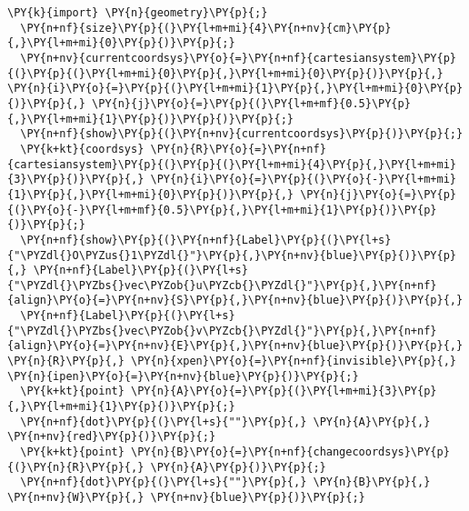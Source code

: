 \begin{Verbatim}[commandchars=\\\{\}]
  \PY{k}{import} \PY{n}{geometry}\PY{p}{;}
  \PY{n+nf}{size}\PY{p}{(}\PY{l+m+mi}{4}\PY{n+nv}{cm}\PY{p}{,}\PY{l+m+mi}{0}\PY{p}{)}\PY{p}{;}
  \PY{n+nv}{currentcoordsys}\PY{o}{=}\PY{n+nf}{cartesiansystem}\PY{p}{(}\PY{p}{(}\PY{l+m+mi}{0}\PY{p}{,}\PY{l+m+mi}{0}\PY{p}{)}\PY{p}{,} \PY{n}{i}\PY{o}{=}\PY{p}{(}\PY{l+m+mi}{1}\PY{p}{,}\PY{l+m+mi}{0}\PY{p}{)}\PY{p}{,} \PY{n}{j}\PY{o}{=}\PY{p}{(}\PY{l+m+mf}{0.5}\PY{p}{,}\PY{l+m+mi}{1}\PY{p}{)}\PY{p}{)}\PY{p}{;}
  \PY{n+nf}{show}\PY{p}{(}\PY{n+nv}{currentcoordsys}\PY{p}{)}\PY{p}{;}
  \PY{k+kt}{coordsys} \PY{n}{R}\PY{o}{=}\PY{n+nf}{cartesiansystem}\PY{p}{(}\PY{p}{(}\PY{l+m+mi}{4}\PY{p}{,}\PY{l+m+mi}{3}\PY{p}{)}\PY{p}{,} \PY{n}{i}\PY{o}{=}\PY{p}{(}\PY{o}{-}\PY{l+m+mi}{1}\PY{p}{,}\PY{l+m+mi}{0}\PY{p}{)}\PY{p}{,} \PY{n}{j}\PY{o}{=}\PY{p}{(}\PY{o}{-}\PY{l+m+mf}{0.5}\PY{p}{,}\PY{l+m+mi}{1}\PY{p}{)}\PY{p}{)}\PY{p}{;}
  \PY{n+nf}{show}\PY{p}{(}\PY{n+nf}{Label}\PY{p}{(}\PY{l+s}{"\PYZdl{}O\PYZus{}1\PYZdl{}"}\PY{p}{,}\PY{n+nv}{blue}\PY{p}{)}\PY{p}{,} \PY{n+nf}{Label}\PY{p}{(}\PY{l+s}{"\PYZdl{}\PYZbs{}vec\PYZob{}u\PYZcb{}\PYZdl{}"}\PY{p}{,}\PY{n+nf}{align}\PY{o}{=}\PY{n+nv}{S}\PY{p}{,}\PY{n+nv}{blue}\PY{p}{)}\PY{p}{,}
  \PY{n+nf}{Label}\PY{p}{(}\PY{l+s}{"\PYZdl{}\PYZbs{}vec\PYZob{}v\PYZcb{}\PYZdl{}"}\PY{p}{,}\PY{n+nf}{align}\PY{o}{=}\PY{n+nv}{E}\PY{p}{,}\PY{n+nv}{blue}\PY{p}{)}\PY{p}{,} \PY{n}{R}\PY{p}{,} \PY{n}{xpen}\PY{o}{=}\PY{n+nf}{invisible}\PY{p}{,} \PY{n}{ipen}\PY{o}{=}\PY{n+nv}{blue}\PY{p}{)}\PY{p}{;}
  \PY{k+kt}{point} \PY{n}{A}\PY{o}{=}\PY{p}{(}\PY{l+m+mi}{3}\PY{p}{,}\PY{l+m+mi}{1}\PY{p}{)}\PY{p}{;}
  \PY{n+nf}{dot}\PY{p}{(}\PY{l+s}{""}\PY{p}{,} \PY{n}{A}\PY{p}{,} \PY{n+nv}{red}\PY{p}{)}\PY{p}{;}
  \PY{k+kt}{point} \PY{n}{B}\PY{o}{=}\PY{n+nf}{changecoordsys}\PY{p}{(}\PY{n}{R}\PY{p}{,} \PY{n}{A}\PY{p}{)}\PY{p}{;}
  \PY{n+nf}{dot}\PY{p}{(}\PY{l+s}{""}\PY{p}{,} \PY{n}{B}\PY{p}{,} \PY{n+nv}{W}\PY{p}{,} \PY{n+nv}{blue}\PY{p}{)}\PY{p}{;}
\end{Verbatim}
